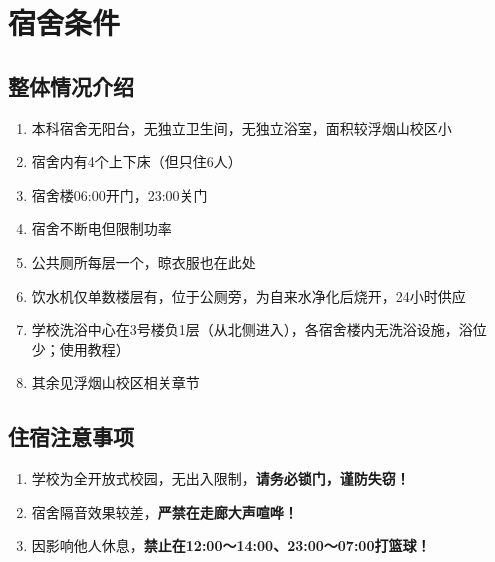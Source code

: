 \section[宿舍条件]{宿舍条件}

\subsection[整体情况介绍]{整体情况介绍}
\begin{enumerate}
    \item 本科宿舍无阳台，无独立卫生间，无独立浴室，面积较浮烟山校区小
    \item 宿舍内有4个上下床（但只住6人）
    \item 宿舍楼06:00开门，23:00关门
    \item 宿舍不断电但限制功率\footnotemark
    \item 公共厕所每层一个，晾衣服也在此处
    \item 饮水机仅单数楼层有，位于公厕旁，为自来水净化后烧开，24小时供应
    \item 学校洗浴中心在3号楼负1层（从北侧进入），各宿舍楼内无洗浴设施，浴位少；使用教程）
    \item 其余见浮烟山校区相关章节
\end{enumerate}

\subsection[住宿注意事项]{住宿注意事项}
\begin{enumerate}
    \item 学校为全开放式校园，无出入限制，\textbf{请务必锁门，谨防失窃！}
    \item 宿舍隔音效果较差，\textbf{严禁在走廊大声喧哗！}
    \item 因影响他人休息，\textbf{禁止在12:00～14:00、23:00～07:00打篮球！}
\end{enumerate}